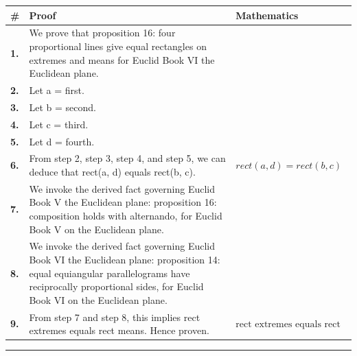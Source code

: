 \documentclass[11pt]{article}
\theoremstyle{definition}
\begin{document}
\begin{tabular}{@{} >{\raggedright\arraybackslash}p{} >{\raggedright\arraybackslash}p{} >{\raggedleft\arraybackslash}p{} @{}}
\textbf{\#} & \textbf{Proof} & \textbf{Mathematics} \\
\midrule
\textbf{1.} & We prove that proposition 16: four proportional lines give equal rectangles on extremes and means for Euclid Book VI the Euclidean plane. & \\[0.45em]
\textbf{2.} & Let a = first. & \\[0.45em]
\textbf{3.} & Let b = second. & \\[0.45em]
\textbf{4.} & Let c = third. & \\[0.45em]
\textbf{5.} & Let d = fourth. & \\[0.45em]
\textbf{6.} & From step 2, step 3, step 4, and step 5, we can deduce that rect(a, d) equals rect(b, c). & $\displaystyle rect(a, d) = rect(b, c)$ \\[0.45em]
\textbf{7.} & We invoke the derived fact governing Euclid Book V the Euclidean plane: proposition 16: composition holds with alternando, for Euclid Book V on the Euclidean plane. & \\[0.45em]
\textbf{8.} & We invoke the derived fact governing Euclid Book VI the Euclidean plane: proposition 14: equal equiangular parallelograms have reciprocally proportional sides, for Euclid Book VI on the Euclidean plane. & \\[0.45em]
\textbf{9.} & From step 7 and step 8, this implies rect extremes equals rect means. Hence proven. & $\displaystyle \text{rect extremes equals rect means}$ \\[0.45em]
\bottomrule
\end{tabular}
\label{thm:Geometry-Euclid Book VI-proposition_16_four_proportional_lines_give_equal_rectangles_on_extremes_and_means}
\par\medskip\hrule
\end{document}
